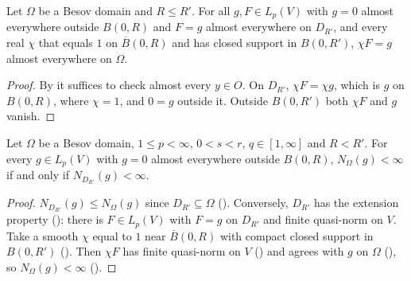 \begin{lemma}
\label{lem:besov-domain-cutoff}
\leanok
{}
Let $\Omega$ be a Besov domain and $R \leq R'$. For all $g, F \in L_p(V)$ with $g = 0$ almost
everywhere outside $B(0, R)$ and $F = g$ almost everywhere on $D_{R'}$, and every real $\chi$ that
equals $1$ on $\overline{B}(0, R)$ and has closed support in $B(0, R')$, $\chi F = g$ almost
everywhere on $\Omega$.
\end{lemma}

\begin{proof}
\leanok
By  it suffices to check almost every $y \in O$. On
$D_{R'}$, $\chi F = \chi g$, which is $g$ on $B(0, R)$, where $\chi = 1$, and $0 = g$ outside it.
Outside $B(0, R')$ both $\chi F$ and $g$ vanish.
\end{proof}

\begin{lemma}
\label{lem:besov-domain-localisation}
\leanok
{}
Let $\Omega$ be a Besov domain, $1 \leq p < \infty$, $0 < s < r$, $q \in [1, \infty]$ and
$R < R'$. For every $g \in L_p(V)$ with $g = 0$ almost everywhere outside $B(0, R)$,
$N_\Omega(g) < \infty$ if and only if $N_{D_{R'}}(g) < \infty$.
\end{lemma}

\begin{proof}
\leanok
$N_{D_{R'}}(g) \leq N_\Omega(g)$ since $D_{R'} \subseteq \Omega$ ().
Conversely, $D_{R'}$ has the extension property (): there
is $F \in L_p(V)$ with $F = g$ on $D_{R'}$ and finite quasi-norm on $V$. Take a smooth $\chi$ equal
to $1$ near $\overline{B}(0, R)$ with compact closed support in $B(0, R')$
(). Then $\chi F$ has finite quasi-norm on $V$
() and agrees with $g$ on $\Omega$ (), so
$N_\Omega(g) < \infty$ ().
\end{proof}

